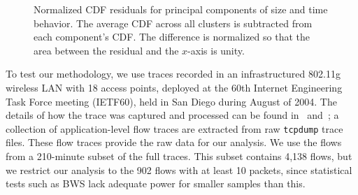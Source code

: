 \documentclass[conference]{IEEEtran}
\newcommand{\caps}[1]{{\small{#1}}}
\begin{document}
\begin{figure}
\vspace{-0.5em}
\begin{center}
\vspace{-0.3em}
\end{center}
\caption{Normalized {\footnotesize{CDF}} residuals for principal components of size and time behavior. The average {\footnotesize{CDF}} across all clusters is subtracted from each component's {\footnotesize{CDF}}. The difference is normalized so that the area between the residual and the $x$-axis is unity.}
\label{fig:principal-components}
\vspace{-1.4em}
\end{figure}

To test our methodology, we use traces recorded in an infrastructured 802.11g wireless \caps{LAN} with 18 access points, deployed at the 60th Internet Engineering Task Force meeting (\caps{IETF60}), held in San Diego during August of 2004. The details of how the trace was captured and processed can be found in \cite{Karpinski07:realism}~and~\cite{Karpinski07:cbr-failure}; a collection of application-level flow traces are extracted from raw \texttt{\small{tcpdump}} trace files. These flow traces provide the raw data for our analysis. We use the flows from a 210-minute subset of the full traces. This subset contains 4,138 flows, but we restrict our analysis to the 902 flows with at least 10 packets, since statistical tests such as \caps{BWS} lack adequate power for smaller samples than this.
\end{document}
